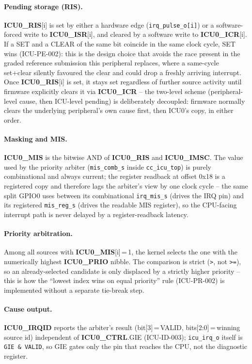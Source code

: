 \paragraph{Pending storage (RIS).} \textbf{ICU0\_RIS}[i] is set by either
a hardware edge (\texttt{irq\_pulse\_o[i]}) or a software-forced write to
\textbf{ICU0\_ISR}[i], and cleared by a software write to
\textbf{ICU0\_ICR}[i]. If a SET and a CLEAR of the same bit coincide in
the same clock cycle, SET wins (ICU-PE-002): this is the design choice
that avoids the race present in the graded reference submission this
peripheral replaces, where a same-cycle set+clear silently favoured the
clear and could drop a freshly arriving interrupt. Once
\textbf{ICU0\_RIS}[i] is set, it stays set regardless of further source
activity until firmware explicitly clears it via \textbf{ICU0\_ICR} --
the two-level scheme (peripheral-level cause, then ICU-level pending) is
deliberately decoupled: firmware normally clears the underlying
peripheral's own cause first, then ICU0's copy, in either order.

\paragraph{Masking and MIS.} \textbf{ICU0\_MIS} is the bitwise AND of
\textbf{ICU0\_RIS} and \textbf{ICU0\_IMSC}. The value used by the
priority arbiter (\texttt{mis\_comb\_s} inside \texttt{cc\_icu\_top}) is
purely combinational and always current; the register readback at offset
0x18 is a registered copy and therefore lags the arbiter's view by one
clock cycle -- the same split GPIO0 uses between its combinational
\texttt{irq\_mis\_s} (drives the IRQ pin) and its registered
\texttt{mis\_reg\_s} (drives the readable MIS register), so the
CPU-facing interrupt path is never delayed by a register-readback
latency.

\paragraph{Priority arbitration.} Among all sources with
\textbf{ICU0\_MIS}[i]\,=\,1, the kernel selects the one with the
numerically highest \textbf{ICU0\_PRIO} nibble. The comparison is strict
(\texttt{>}, not \texttt{>=}), so an already-selected candidate is only
displaced by a strictly higher priority -- this is how the ``lowest index
wins on equal priority'' rule (ICU-PR-002) is implemented without a
separate tie-break step.

\paragraph{Cause output.} \textbf{ICU0\_IRQID} reports the arbiter's
result (bit[3]\,=\,VALID, bits[2:0]\,=\,winning source id) independent of
\textbf{ICU0\_CTRL}.GIE (ICU-ID-003); \texttt{icu\_irq\_o} itself is
\texttt{GIE \& VALID}, so GIE gates only the pin that reaches the CPU, not
the diagnostic register.

